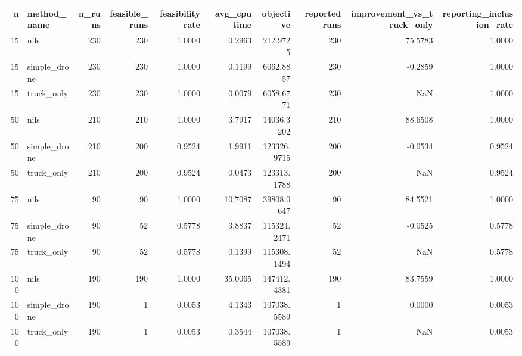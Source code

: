 \begin{tabular}{rlrrrrrrrr}
\toprule
n & method_name & n_runs & feasible_runs & feasibility_rate & avg_cpu_time & objective & reported_runs & improvement_vs_truck_only & reporting_inclusion_rate \\
\midrule
15 & nils & 230 & 230 & 1.0000 & 0.2963 & 212.9725 & 230 & 75.5783 & 1.0000 \\
15 & simple_drone & 230 & 230 & 1.0000 & 0.1199 & 6062.8857 & 230 & -0.2859 & 1.0000 \\
15 & truck_only & 230 & 230 & 1.0000 & 0.0079 & 6058.6771 & 230 & NaN & 1.0000 \\
50 & nils & 210 & 210 & 1.0000 & 3.7917 & 14036.3202 & 210 & 88.6508 & 1.0000 \\
50 & simple_drone & 210 & 200 & 0.9524 & 1.9911 & 123326.9715 & 200 & -0.0534 & 0.9524 \\
50 & truck_only & 210 & 200 & 0.9524 & 0.0473 & 123313.1788 & 200 & NaN & 0.9524 \\
75 & nils & 90 & 90 & 1.0000 & 10.7087 & 39808.0647 & 90 & 84.5521 & 1.0000 \\
75 & simple_drone & 90 & 52 & 0.5778 & 3.8837 & 115324.2471 & 52 & -0.0525 & 0.5778 \\
75 & truck_only & 90 & 52 & 0.5778 & 0.1399 & 115308.1494 & 52 & NaN & 0.5778 \\
100 & nils & 190 & 190 & 1.0000 & 35.0065 & 147412.4381 & 190 & 83.7559 & 1.0000 \\
100 & simple_drone & 190 & 1 & 0.0053 & 4.1343 & 107038.5589 & 1 & 0.0000 & 0.0053 \\
100 & truck_only & 190 & 1 & 0.0053 & 0.3544 & 107038.5589 & 1 & NaN & 0.0053 \\
\bottomrule
\end{tabular}
